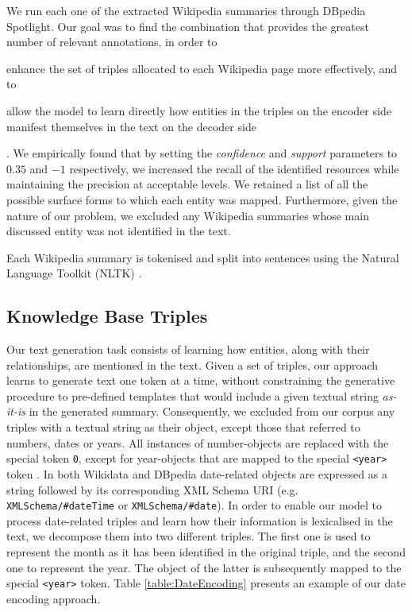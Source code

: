 \documentclass[preprint,5p]{elsarticle}
\begin{document}
We run each one of the extracted Wikipedia summaries through DBpedia Spotlight. Our goal was to find the combination that provides the greatest number of relevant annotations, in order to\begin{inparaenum}[(i)]\item enhance the set of triples allocated to each Wikipedia page more effectively, and to \item allow the model to learn directly how entities in the triples on the encoder side manifest themselves in the text on the decoder side\end{inparaenum}. We empirically found that by setting the \textit{confidence} and \textit{support} parameters to $0.35$ and $-1$ respectively, we increased the recall of the identified resources while maintaining the precision at acceptable levels. We retained a list of all the possible surface forms to which each entity was mapped. Furthermore, given the nature of our problem, we excluded any Wikipedia summaries whose main discussed entity was not identified in the text.

Each Wikipedia summary is tokenised and split into sentences using the Natural Language Toolkit (NLTK) \cite{Bird2009}.
  
\subsection{Knowledge Base Triples}
\label{subsec:Triples}

Our text generation task consists of learning how entities, along with their relationships, are mentioned in the text. Given a set of triples, our approach learns to generate text one token at a time, without constraining the generative procedure to pre-defined templates that would include a given textual string \textit{as-it-is} in the generated summary. Consequently, we excluded from our corpus any triples with a textual string as their object, except those that referred to numbers, dates or years. All instances of number-objects are replaced with the special token \texttt{0}, except for year-objects that are mapped to the special \texttt{<year>} token \cite{Lebret2016}. In both Wikidata and DBpedia date-related objects are expressed as a string followed by its corresponding XML Schema URI (e.g. \texttt{XMLSchema/\-\#dateTime} or \texttt{XMLSchema/\-\#date}). In order to enable our model to process date-related triples and learn how their information is lexicalised in the text, we decompose them into two different triples. The first one is used to represent the month as it has been identified in the original triple, and the second one to represent the year. The object of the latter is subsequently mapped to the special \texttt{<year>} token. Table \ref{table:DateEncoding} presents an example of our date encoding approach.
\end{document}
